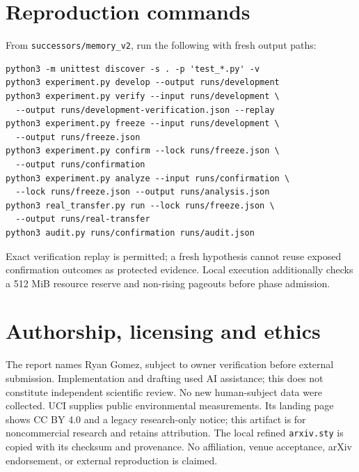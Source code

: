 \documentclass[10pt]{article}
\begin{document}
\section{Reproduction commands}
From \texttt{successors/memory\_v2}, run the following with fresh output paths:
\begin{verbatim}
python3 -m unittest discover -s . -p 'test_*.py' -v
python3 experiment.py develop --output runs/development
python3 experiment.py verify --input runs/development \
  --output runs/development-verification.json --replay
python3 experiment.py freeze --input runs/development \
  --output runs/freeze.json
python3 experiment.py confirm --lock runs/freeze.json \
  --output runs/confirmation
python3 experiment.py analyze --input runs/confirmation \
  --lock runs/freeze.json --output runs/analysis.json
python3 real_transfer.py run --lock runs/freeze.json \
  --output runs/real-transfer
python3 audit.py runs/confirmation runs/audit.json
\end{verbatim}
Exact verification replay is permitted; a fresh hypothesis cannot reuse exposed confirmation outcomes as protected evidence. Local execution additionally checks a 512 MiB resource reserve and non-rising pageouts before phase admission.

\section{Authorship, licensing and ethics}
The report names Ryan Gomez, subject to owner verification before external submission. Implementation and drafting used AI assistance; this does not constitute independent scientific review. No new human-subject data were collected. UCI supplies public environmental measurements. Its landing page shows CC BY 4.0 and a legacy research-only notice; this artifact is for noncommercial research and retains attribution. The local refined \texttt{arxiv.sty} is copied with its checksum and provenance. No affiliation, venue acceptance, arXiv endorsement, or external reproduction is claimed.
\end{document}

